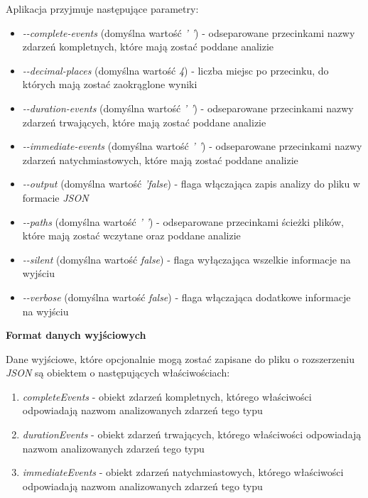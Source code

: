 \documentclass[polish, twoside, 12pt]{mwart}
\begin{document}
Aplikacja przyjmuje następujące parametry:

\begin{itemize}
  \item \emph{-{}-complete-events} (domyślna wartość \emph{' '}) - odseparowane przecinkami nazwy zdarzeń kompletnych, które mają zostać poddane analizie
  \item \emph{-{}-decimal-places} (domyślna wartość \emph{4}) - liczba miejsc po przecinku, do których mają zostać zaokrąglone wyniki
  \item \emph{-{}-duration-events} (domyślna wartość \emph{' '}) - odseparowane przecinkami nazwy zdarzeń trwających, które mają zostać poddane analizie
  \item \emph{-{}-immediate-events} (domyślna wartość \emph{' '}) - odseparowane przecinkami nazwy zdarzeń natychmiastowych, które mają zostać poddane analizie
  \item \emph{-{}-output} (domyślna wartość \emph{'false}) - flaga włączająca zapis analizy do pliku w formacie \emph{JSON}
  \item \emph{-{}-paths} (domyślna wartość \emph{' '}) - odseparowane przecinkami ścieżki plików, które mają zostać wczytane oraz poddane analizie
  \item \emph{-{}-silent} (domyślna wartość \emph{false}) - flaga wyłączająca wszelkie informacje na wyjściu
  \item \emph{-{}-verbose} (domyślna wartość \emph{false}) - flaga włączająca dodatkowe informacje na wyjściu
\end{itemize}

\textbf{Format danych wyjściowych} \newline

Dane wyjściowe, które opcjonalnie mogą zostać zapisane do pliku o rozszerzeniu \emph{JSON} są obiektem o następujących właściwościach:

\begin{enumerate}
  \item \emph{completeEvents} - obiekt zdarzeń kompletnych, którego właściwości odpowiadają nazwom analizowanych zdarzeń tego typu
  \item \emph{durationEvents} - obiekt zdarzeń trwających, którego właściwości odpowiadają nazwom analizowanych zdarzeń tego typu
  \item \emph{immediateEvents} - obiekt zdarzeń natychmiastowych, którego właściwości odpowiadają nazwom analizowanych zdarzeń tego typu
\end{enumerate}
\end{document}
